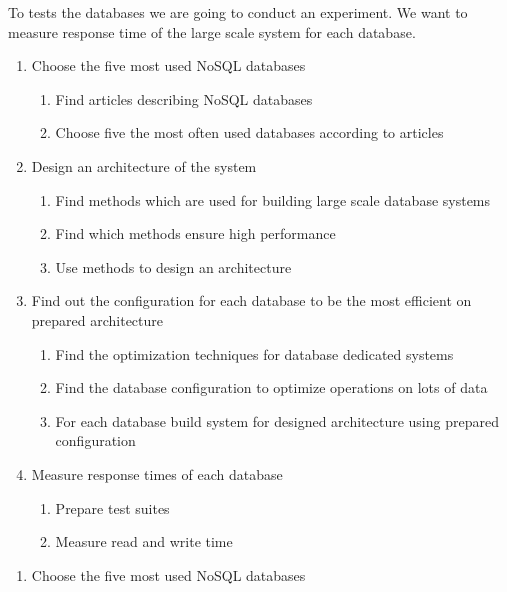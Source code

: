 \documentclass[times, 10pt,twocolumn]{article}
\begin{document}
To tests the databases we are going to conduct an experiment. We want to measure response time of the large scale
system for each database.


\begin{enumerate}
  \item Choose the five most used NoSQL databases
	\begin{enumerate}
	  \item Find articles describing NoSQL databases
	  \item Choose five the most often used databases according to articles 
	\end{enumerate}
  \item Design an architecture of the system
	\begin{enumerate}
	  \item Find methods which are used for building large scale database systems
	  \item Find which methods ensure high performance
	  \item Use methods to design an architecture
	\end{enumerate}
  \item Find out the configuration for each database to be the most efficient on prepared architecture
    \begin{enumerate}
	  \item Find the optimization techniques for database dedicated systems
	  \item Find the database configuration to optimize operations on lots of data
	  \item For each database build system for designed architecture using prepared configuration
	\end{enumerate}
  \item Measure response times of each database
    \begin{enumerate}
      \item Prepare test suites
      \item Measure read and write time   
    \end{enumerate}  
\end{enumerate}


	\begin{enumerate}
	  \item Choose the five most used NoSQL databases
	\end{enumerate}
	
\end{document}
